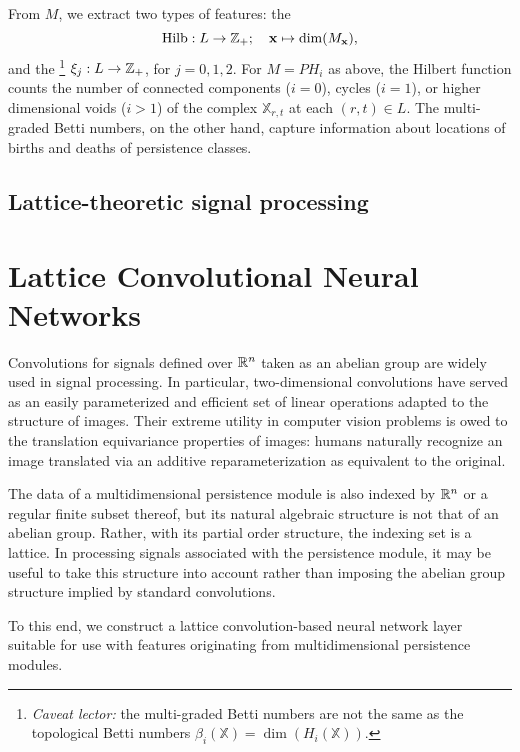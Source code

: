 \documentclass{article}
\begin{document}

From $M$, we extract two types of features:
 the 
  \[\text{Hilb}: L \to \mathbb{Z}_+;\quad \mathbf{x} \mapsto \dim(M_\mathbf{x}),\] and
the \footnote{\textit{Caveat lector:} the
multi-graded Betti numbers are not the same as the topological Betti numbers
$\beta_i(\mathbb{X}) = \dim(H_i(\mathbb{X}))$.} $\xi_j: L \to \mathbb{Z}_+$, for $j =
0,1,2$. For $M = PH_i$ as above, the Hilbert function counts the number of
connected components ($i=0$), cycles ($i=1$), or higher dimensional voids ($i >
1$) of the complex $\mathbb{X}_{r,t}$ at each $(r,t) \in L$. The multi-graded
Betti numbers, on the other hand, capture information about locations of births
and deaths of persistence classes.

\subsection{Lattice-theoretic signal processing}


\section{Lattice Convolutional Neural Networks}

Convolutions for signals defined over $\mathbb{R}^n$ taken as an abelian group are
widely used in signal processing. In particular, two-dimensional convolutions
have served as an easily parameterized and efficient set of linear operations
adapted to the structure of images. Their extreme utility in computer vision
problems is owed to the translation equivariance properties of images: humans
naturally recognize an image translated via an additive reparameterization as
equivalent to the original.

The data of a multidimensional persistence module is also indexed by $\mathbb{R}^n$ or a
regular finite subset thereof, but its natural algebraic structure is not that
of an abelian group. Rather, with its partial order structure, the indexing set
is a lattice. In processing signals associated with the persistence module, it
may be useful to take this structure into account rather than imposing the
abelian group structure implied by standard convolutions.

To this end, we construct a lattice convolution-based neural network layer
suitable for use with features originating from multidimensional persistence
modules. 
\end{document}
